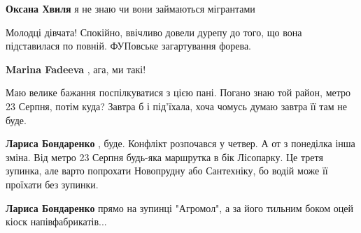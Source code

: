 \begin{itemize}
\begin{itemize}
\textbf{Оксана Хвиля} я не знаю чи вони займаються мігрантами
\end{itemize}

 
Молодці дівчата! Спокійно, ввічливо довели дурепу до того, що вона підставилася
по повній. ФУПовське загартування форева.

\begin{itemize}
 
\textbf{Marina Fadeeva} , ага, ми такі!
\end{itemize}

 

Маю велике бажання поспілкуватися з цією пані. Погано знаю той район, метро 23
Серпня, потім куда? Завтра б і під'їхала, хоча чомусь думаю завтра її там не
буде.

\begin{itemize}
 
\textbf{Лариса Бондаренко} , буде. Конфлікт розпочався у четвер. А от з
понеділка інша зміна. Від метро 23 Серпня будь-яка маршрутка в бік Лісопарку.
Це третя зупинка, але варто попрохати Новопрудну або Сантехніку, бо водій може
її проїхати без зупинки.

 
\textbf{Лариса Бондаренко} прямо на зупинці "Агромол", а за його тильним боком оцей кіоск напівфабрикатів...
\end{itemize}


\end{itemize}
